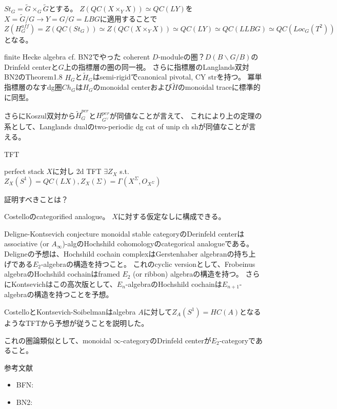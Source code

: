 \documentclass[dvipdfmx]{beamer}
\begin{document}
\begin{frame}
$St_G=\tilde{G}\times_G\tilde{G}$とする。
$Z(QC(X\times_YX)) \simeq QC(LY)$を$X=\tilde{G}/G \to Y=G/G=LBG$に適用することで
$Z(H^{aff}_G)=Z(QC(St_G))\simeq Z(QC(X\times_YX))\simeq QC(LY)\simeq QC(LLBG)\simeq QC(Loc_G(T^2))$となる。
\end{frame}

\begin{frame}{finite Hecke algebra}
cf. BN2でやった
coherent $D$-moduleの圏？$D(B\backslash G/B)$のDrinfeld centerと$G$上の指標層の圏の同一視。
さらに指標層のLanglands双対
BN2のTheorem1.8
$H_G$と$\tilde{H}_G$はsemi-rigidでcanonical pivotal, CY strを持つ。
冪単指標層のなすdg圏$Ch_G$は$H_G$のmonoidal centerおよび$\tilde{H}$のmonoidal traceに標準的に同型。

さらにKoszul双対から$\tilde{H}^{per}_G$と$H^{per}_{G^{\vee}}$が同値なことが言えて、
これにより上の定理の系として、Langlands dualのtwo-periodic dg cat of unip ch shが同値なことが言える。
\end{frame}

\begin{frame}{TFT}
\begin{dfn}
\end{dfn}

\begin{prop}
perfect stack $X$に対し 2d TFT $\exists Z_X$ s.t. $Z_X(S^1)=QC(LX), Z_X(\Sigma)=\Gamma(X^\Sigma, O_{X^\Sigma})$
\end{prop}
証明すべきことは？

Costelloのcategorified analogue。
$X$に対する仮定なしに構成できる。
\end{frame}

\begin{frame}{Deligne-Kontsevich conjecture}
monoidal stable categoryのDerinfeld centerはassociative (or $A_\infty$)-algのHochshild cohomologyのcategorical analogueである。
Deligneの予想は、Hochshild cochain complexはGerstenhaber algebranの持ち上げである$E_2$-algebraの構造を持つこと。
これのcyclic versionとして、Frobeinus algebraのHochshild cochainはframed $E_2$ (or ribbon) algebraの構造を持つ。
さらにKontsevichはこの高次版として、$E_n$-algebraのHochshild cochainは$E_{n+1}$-algebraの構造を持つことを予想。

CostelloとKontsevich-Soibelmanはalgebra $A$に対して$Z_A(S^1)=HC(A)$となるようなTFTから予想が従うことを説明した。

これの圏論類似として、monoidal $\infty$-categoryのDrinfeld centerが$E_2$-categoryであること。
\end{frame}

\begin{frame}{参考文献}
\begin{itemize}
\item BFN:
\item BN2:
\end{itemize}
\end{frame}
\end{document}
